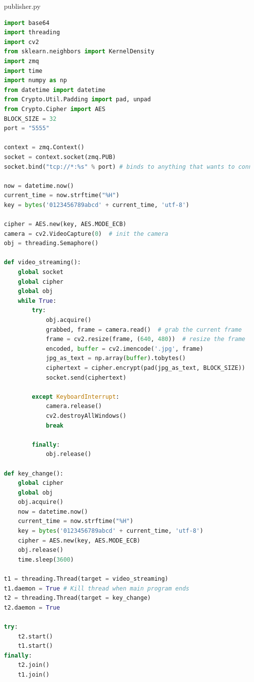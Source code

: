 \documentclass{article}
\begin{document}
publisher.py
\begin{lstlisting}[language=Python]
import base64
import threading
import cv2
from sklearn.neighbors import KernelDensity
import zmq
import time
import numpy as np
from datetime import datetime
from Crypto.Util.Padding import pad, unpad
from Crypto.Cipher import AES
BLOCK_SIZE = 32
port = "5555"

context = zmq.Context()
socket = context.socket(zmq.PUB)
socket.bind("tcp://*:%s" % port) # binds to anything that wants to connect

now = datetime.now()
current_time = now.strftime("%H")
key = bytes('0123456789abcd' + current_time, 'utf-8')

cipher = AES.new(key, AES.MODE_ECB)
camera = cv2.VideoCapture(0)  # init the camera
obj = threading.Semaphore()

def video_streaming():
    global socket
    global cipher
    global obj
    while True:
        try:
            obj.acquire()
            grabbed, frame = camera.read()  # grab the current frame
            frame = cv2.resize(frame, (640, 480))  # resize the frame
            encoded, buffer = cv2.imencode('.jpg', frame)
            jpg_as_text = np.array(buffer).tobytes()
            ciphertext = cipher.encrypt(pad(jpg_as_text, BLOCK_SIZE))
            socket.send(ciphertext)

        except KeyboardInterrupt:
            camera.release()
            cv2.destroyAllWindows()
            break

        finally:
            obj.release()

def key_change():
    global cipher
    global obj
    obj.acquire()
    now = datetime.now()
    current_time = now.strftime("%H")
    key = bytes('0123456789abcd' + current_time, 'utf-8')
    cipher = AES.new(key, AES.MODE_ECB)
    obj.release()
    time.sleep(3600)

t1 = threading.Thread(target = video_streaming)
t1.daemon = True # Kill thread when main program ends
t2 = threading.Thread(target = key_change)
t2.daemon = True

try:
    t2.start()
    t1.start()
finally:
    t2.join()
    t1.join()

\end{lstlisting}
\end{document}
